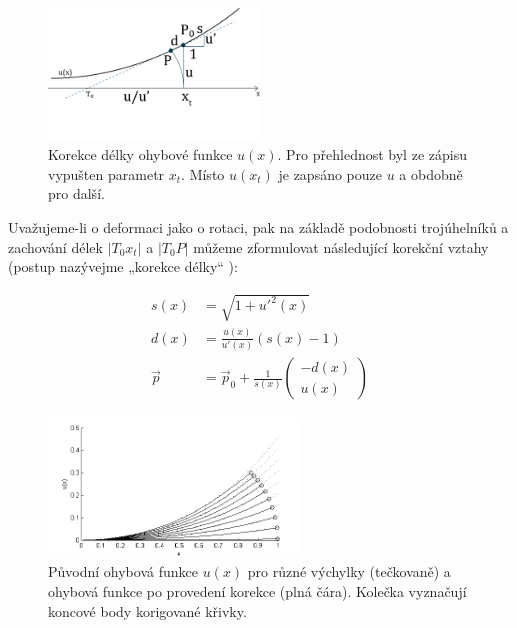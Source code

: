 \begin{figure}[!hbt]
\begin{center}
\includegraphics[width=0.5\textwidth]{./figures/lengthCorrection3.png}
\end{center}
\caption[Korekce délky ohybové funkce]%
{Korekce délky ohybové funkce $u(x)$. Pro přehlednost byl ze zápisu vypušten parametr $x_t$. Místo $u(x_t)$ je zapsáno pouze $u$ a obdobně pro další.
\label{fig:bendCorrection}
}
\end{figure}

Uvažujeme-li o deformaci jako o rotaci, pak na základě podobnosti trojúhelníků a zachování délek $|T_0x_t|$ a $|T_0P|$ můžeme zformulovat následující korekční vztahy (postup nazývejme „korekce délky“ ):

\begin{align} 
 \label{lengthCorrection}
s(x) &= \sqrt{1 + u'^{2}(x)}\nonumber\\
d(x) &= \frac{u(x)}{u'(x)}(s(x)-1)\nonumber
\\
\vec{p} &= \vec{p}_0 + \frac{1}{s(x)}\begin{pmatrix}
-d(x)\\u(x) 
\end{pmatrix}
\end{align}

 

\begin{figure}[!hbt]
\begin{center}
\includegraphics[width=0.60\textwidth]{./figures/lengthCorrectionErrorGraph2.png}
\end{center}
\caption[Původní ohybová funkce]%
{Původní ohybová funkce $u(x)$ pro různé výchylky (tečkovaně) a ohybová funkce po provedení korekce (plná čára). Kolečka vyznačují koncové body korigované křivky.
\label{fig:bendCorrectionGraph}
}
\end{figure}



